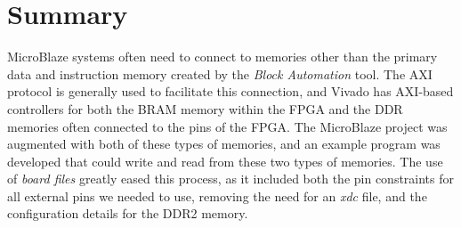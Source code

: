 \documentclass[11pt]{article}
\begin{document}
\section{Summary}
\label{sec:summary}
MicroBlaze systems often need to connect to memories other than the primary data and instruction memory created by the \textit{Block Automation} tool. The AXI protocol is generally used to facilitate this connection, and Vivado has AXI-based controllers for both the BRAM memory within the FPGA and the DDR memories often connected to the pins of the FPGA. The MicroBlaze project was augmented with both of these types of memories, and an example program was developed that could write and read from these two types of memories. The use of \textit{board files} greatly eased this process, as it included both the pin constraints for all external pins we needed to use, removing the need for an \textit{xdc} file, and the configuration details for the DDR2 memory.



\end{document}
